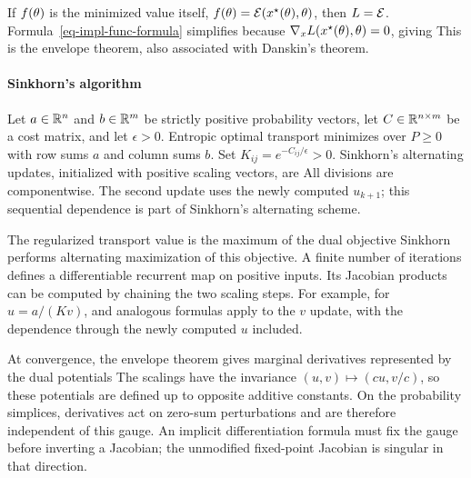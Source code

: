 If $f(\theta)$ is the minimized value itself, $f(\theta)=\mathcal{E}(x^\star(\theta),\theta)$, then $L=\mathcal{E}$. Formula~\eqref{eq-impl-func-formula} simplifies because $\nabla_x L(x^\star(\theta),\theta)=0$, giving
This is the envelope theorem, also associated with Danskin's theorem.


\paragraph{Sinkhorn's algorithm}

Let $a\in\mathbb{R}^n$ and $b\in\mathbb{R}^m$ be strictly positive probability vectors, let $C\in\mathbb{R}^{n\times m}$ be a cost matrix, and let $\epsilon>0$. Entropic optimal transport minimizes
over $P\geq0$ with row sums $a$ and column sums $b$. Set $K_{ij}=e^{-C_{ij}/\epsilon}>0$. Sinkhorn's alternating updates, initialized with positive scaling vectors, are
All divisions are componentwise. The second update uses the newly computed $u_{k+1}$; this sequential dependence is part of Sinkhorn's alternating scheme.

The regularized transport value is the maximum of the dual objective
Sinkhorn performs alternating maximization of this objective. A finite number of iterations defines a differentiable recurrent map on positive inputs. Its Jacobian products can be computed by chaining the two scaling steps. For example, for $u=a/(Kv)$,
and analogous formulas apply to the $v$ update, with the dependence through the newly computed $u$ included.

At convergence, the envelope theorem gives marginal derivatives represented by the dual potentials
The scalings have the invariance $(u,v)\mapsto(cu,v/c)$, so these potentials are defined up to opposite additive constants. On the probability simplices, derivatives act on zero-sum perturbations and are therefore independent of this gauge. An implicit differentiation formula must fix the gauge before inverting a Jacobian; the unmodified fixed-point Jacobian is singular in that direction.
